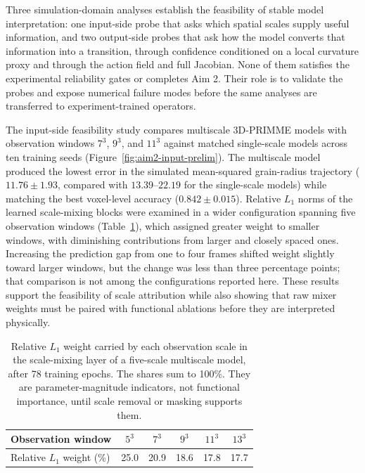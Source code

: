 \documentclass[proposalMode]{ufdissertation}
\begin{document}
Three simulation-domain analyses establish the feasibility of stable model interpretation: one input-side probe that asks which spatial scales supply useful information, and two output-side probes that ask how the model converts that information into a transition, through confidence conditioned on a local curvature proxy and through the action field and full Jacobian. None of them satisfies the experimental reliability gates or completes Aim 2. Their role is to validate the probes and expose numerical failure modes before the same analyses are transferred to experiment-trained operators.

The input-side feasibility study compares multiscale 3D-PRIMME models with observation windows \(7^3\), \(9^3\), and \(11^3\) against matched single-scale models across ten training seeds (Figure~\ref{fig:aim2-input-prelim}). The multiscale model produced the lowest error in the simulated mean-squared grain-radius trajectory (\(11.76\pm1.93\), compared with \(13.39\)--\(22.19\) for the single-scale models) while matching the best voxel-level accuracy (\(0.842\pm0.015\)). Relative \(L_1\) norms of the learned scale-mixing blocks were examined in a wider configuration spanning five observation windows (Table~\ref{tab:scale-mixer-weights}), which assigned greater weight to smaller windows, with diminishing contributions from larger and closely spaced ones. Increasing the prediction gap from one to four frames shifted weight slightly toward larger windows, but the change was less than three percentage points; that comparison is not among the configurations reported here. These results support the feasibility of scale attribution while also showing that raw mixer weights must be paired with functional ablations before they are interpreted physically.

\begin{table}[htbp]
\centering
\caption{Relative \(L_1\) weight carried by each observation scale in the scale-mixing layer of a five-scale multiscale model, after 78 training epochs. The shares sum to 100\%. They are parameter-magnitude indicators, not functional importance, until scale removal or masking supports them.}
\label{tab:scale-mixer-weights}
\small
\begin{tabular}{@{}lccccc@{}}
\toprule
\textbf{Observation window} & \(5^3\) & \(7^3\) & \(9^3\) & \(11^3\) & \(13^3\) \\
\midrule
Relative \(L_1\) weight (\%) & 25.0 & 20.9 & 18.6 & 17.8 & 17.7 \\
\bottomrule
\end{tabular}
\end{table}
\end{document}
